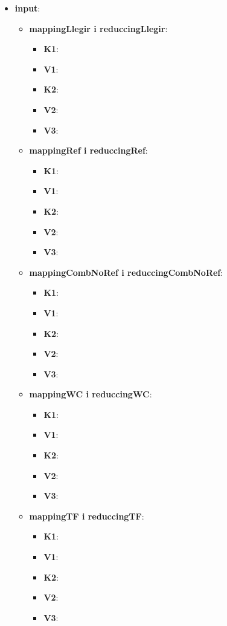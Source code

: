 \documentclass[11pt,a4paper]{article}
\begin{document}
	\begin{itemize}
		\item \textbf{input}: 
		
		\begin{itemize}
		
			\item \textbf{mappingLlegir i reduccingLlegir}:
			\begin{itemize}
				\item \textbf{K1}:
				\item \textbf{V1}:
				\item \textbf{K2}:
				\item \textbf{V2}:
				\item \textbf{V3}:
			\end{itemize}
			
			\item \textbf{mappingRef i reduccingRef}:
			\begin{itemize}
				\item \textbf{K1}:
				\item \textbf{V1}:
				\item \textbf{K2}:
				\item \textbf{V2}:
				\item \textbf{V3}:
			\end{itemize}
			
			\item \textbf{mappingCombNoRef i reduccingCombNoRef}:
			\begin{itemize}
				\item \textbf{K1}:
				\item \textbf{V1}:
				\item \textbf{K2}:
				\item \textbf{V2}:
				\item \textbf{V3}:
			\end{itemize}
			
			\item \textbf{mappingWC i reduccingWC}:
			\begin{itemize}
				\item \textbf{K1}:
				\item \textbf{V1}:
				\item \textbf{K2}:
				\item \textbf{V2}:
				\item \textbf{V3}:
			\end{itemize}
			
			\item \textbf{mappingTF i reduccingTF}:
			\begin{itemize}
				\item \textbf{K1}:
				\item \textbf{V1}:
				\item \textbf{K2}:
				\item \textbf{V2}:
				\item \textbf{V3}:
			\end{itemize}
			

\end{itemize}
\end{itemize}
\end{document}
